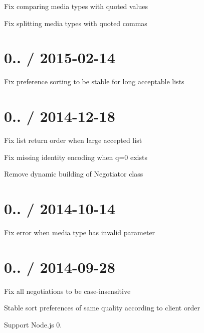\begin{DoxyItemize}
\item Fix comparing media types with quoted values
\item Fix splitting media types with quoted commas
\end{DoxyItemize}

\section*{0.. / 2015-\/02-\/14 }


\begin{DoxyItemize}
\item Fix preference sorting to be stable for long acceptable lists
\end{DoxyItemize}

\section*{0.. / 2014-\/12-\/18 }


\begin{DoxyItemize}
\item Fix list return order when large accepted list
\item Fix missing identity encoding when q=0 exists
\item Remove dynamic building of Negotiator class
\end{DoxyItemize}

\section*{0.. / 2014-\/10-\/14 }


\begin{DoxyItemize}
\item Fix error when media type has invalid parameter
\end{DoxyItemize}

\section*{0.. / 2014-\/09-\/28 }


\begin{DoxyItemize}
\item Fix all negotiations to be case-\/insensitive
\item Stable sort preferences of same quality according to client order
\item Support Node.\+js 0.
\end{DoxyItemize}

